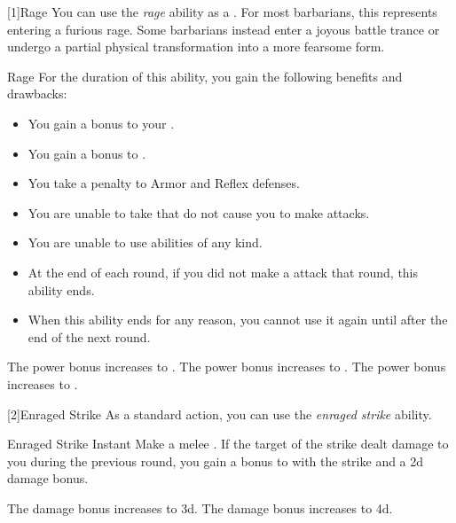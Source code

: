         [1]{Rage} You can use the \textit{rage} ability as a .
        For most barbarians, this represents entering a furious rage.
        Some barbarians instead enter a joyous battle trance or undergo a partial physical transformation into a more fearsome form.
        \begin{durationability}{Rage}
            \rankline
            For the duration of this ability, you gain the following benefits and drawbacks:
            \begin{itemize}
                \item You gain a  bonus to your  .
                \item You gain a  bonus to .
                \item You take a  penalty to Armor and Reflex defenses.
                \item You are unable to take  that do not cause you to make  attacks.
                \item You are unable to use  abilities of any kind.
                \item At the end of each round, if you did not make a  attack that round, this ability ends.
                \item When this ability ends for any reason, you cannot use it again until after the end of the next round.
            \end{itemize}

            \rankline
             The power bonus increases to .
             The power bonus increases to .
             The power bonus increases to .
        \end{durationability}

        [2]{Enraged Strike} As a standard action, you can use the \textit{enraged strike} ability.
        \begin{instantability}{Enraged Strike}
            Instant
            \rankline
            Make a melee .
            If the target of the strike dealt damage to you during the previous round, you gain a  bonus to  with the strike and a \plus2d damage bonus.

            \rankline
             The damage bonus increases to \plus3d.
             The damage bonus increases to \plus4d.
        \end{instantability}

